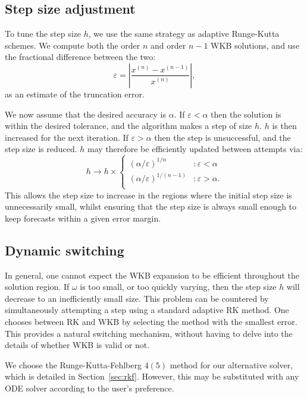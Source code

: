 \subsection{Step size adjustment}
To tune the step size \(h\), we use the same strategy as adaptive Runge-Kutta schemes. We compute both the order \(n\) and order \(n-1\) WKB solutions, and use the fractional difference between the two:
\begin{equation}
  \varepsilon = \left|\frac{x^{(n)}-x^{(n-1)}}{x^{(n)}}\right|,
  \nonumber
\end{equation}
as an estimate of the truncation error. 

We now assume that the desired accuracy is \(\alpha\). If \(\varepsilon<\alpha\) then the solution is within the desired tolerance, and the algorithm makes a step of size \(h\). \(h\) is then increased for the next iteration. If \(\varepsilon>\alpha\) then the step is unsuccessful, and the step size is reduced. \(h\) may therefore be efficiently updated between attempts via:
\begin{equation}
  h \to h\times\left\{
  \begin{array}{lr}
    {(\alpha/\varepsilon)}^{1/n} &: \varepsilon<\alpha \\
    {(\alpha/\varepsilon)}^{1/(n-1)} &: \varepsilon>\alpha. \\
  \end{array}
  \right.\label{eqn:h_update}
\end{equation}
This allows the step size to increase in the regions where the initial step size is unnecessarily small, whilst ensuring that the step size is always small enough to keep forecasts within a given error margin.

\subsection{Dynamic switching}
In general, one cannot expect the WKB expansion to be efficient throughout the solution region. If \(\omega\) is too small, or too quickly varying, then the step size \(h\) will decrease to an inefficiently small size. This problem can be countered by simultaneously attempting a step using a standard adaptive RK method. One chooses between RK and WKB by selecting the method with the smallest error. This provides a natural switching mechanism, without having to delve into the details of whether WKB is valid or not.

We choose the Runge-Kutta-Fehlberg \(4(5)\) method for our alternative solver, which is detailed in Section~\ref{sec:rkf}. However, this may be substituted with any ODE solver according to the user's preference.

